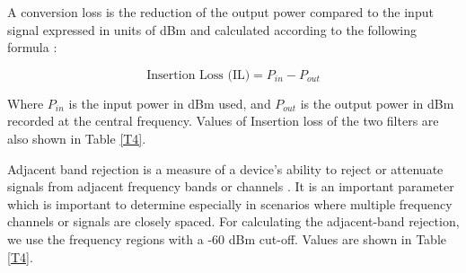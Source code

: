 \documentclass[12pt]{article}
\begin{document}
A conversion loss is the reduction of the output power compared to the input signal expressed in units of dBm and calculated according to the following formula \cite{mixers}:

\begin{equation}
 \text{Insertion Loss (IL)} = P_{in} - P_{out} 
\end{equation}

Where $P_{in}$ is the input power in dBm used, and $P_{out}$ is the output power in dBm recorded at the central frequency. Values of Insertion loss of the two filters are also shown in Table \ref{T4}. 

Adjacent band rejection is a measure of a device's  ability to reject or attenuate signals from adjacent frequency bands or channels \cite{mixers}. It is an important parameter which is important to determine especially in scenarios where multiple frequency channels or signals are closely spaced. For calculating the adjacent-band rejection, we use the frequency regions with a -60 dBm cut-off. Values are shown in Table \ref{T4}.  
\end{document}
